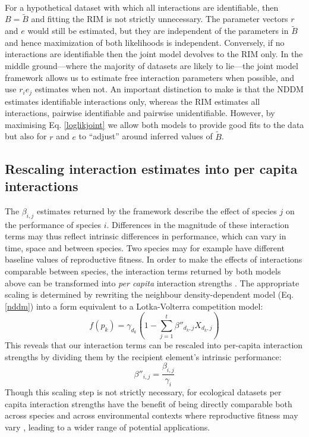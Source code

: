 \documentclass[a4,12pt]{article}
\begin{document}
    \paragraph{}
    For a hypothetical dataset with which all interactions are identifiable, then $B = \tilde B$ and fitting the RIM is not strictly unnecessary. The parameter vectors $r$ and $e$ would still be estimated, but they are independent of the parameters in $\tilde B$ and hence maximization of both likelihoods is independent. Conversely, if no interactions are identifiable then the joint model devolves to the RIM only. In the middle ground---where the majority of datasets are likely to lie---the joint model framework allows us to estimate free interaction parameters when possible, and use $r_i e_j$ estimates when not. An important distinction to make is that the NDDM estimates identifiable interactions only, whereas the RIM estimates all interactions, pairwise identifiable and pairwise unidentifiable. However, by maximising Eq. \ref{loglikjoint} we allow both models to provide good fits to the data but also for $r$ and $e$ to ``adjust'' around inferred values of $\tilde B$. 


    \subsection{Rescaling interaction estimates into per capita interactions}

        The $\beta_{i, j}$ estimates returned by the framework describe the effect of species $j$ on the performance of species $i$. Differences in the magnitude of these interaction terms may thus reflect intrinsic differences in performance, which can vary in time, space and between species. Two species may for example have different baseline values of reproductive fitness. In order to make the effects of interactions comparable between species, the interaction terms returned by both models above can be transformed into \textit{per capita} interaction strengths \parencite{Laska1998}. The appropriate scaling is determined by rewriting the neighbour density-dependent model (Eq. \ref{nddm}) into a form equivalent to a Lotka-Volterra competition model: 
        \begin{equation}
        f(p_{k}) = \gamma_{d_k} \left ( 1 - \sum_{j=1}^{t} {\beta}''_{d_k, j} X_{d_k, j} \right )
        \label{LVform}
        \end{equation}
        This reveals that our interaction terms can be rescaled into per-capita interaction strengths by dividing them by the recipient element's intrinsic performance:  
        \begin{equation}
        {\beta}''_{i, j} = \frac{\beta_{i, j}}{\gamma_{i}}
        \label{scaling}
        \end{equation}
        Though this scaling step is not strictly necessary, for ecological datasets per capita interaction strengths have the benefit of being directly comparable both across species and across environmental contexts where reproductive fitness may vary \parencite{Wootton2005}, leading to a wider range of potential applications.
\end{document}
